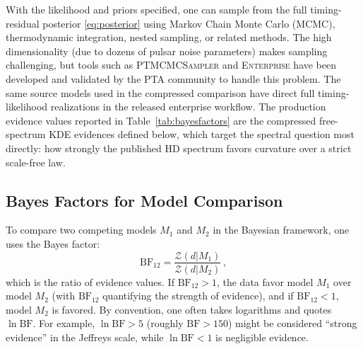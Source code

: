 \documentclass[symmetry,article,submit,pdftex,moreauthors]{Definitions/mdpi}
\begin{document}
With the likelihood and priors specified, one can sample from the full timing-residual posterior \eqref{eq:posterior} using Markov Chain Monte Carlo (MCMC), thermodynamic integration, nested sampling, or related methods. The high dimensionality (due to dozens of pulsar noise parameters) makes sampling challenging, but tools such as \textsc{PTMCMCSampler} and \textsc{Enterprise} \cite{NANOGrav15-Methods} have been developed and validated by the PTA community to handle this problem. The same source models used in the compressed comparison have direct full timing-likelihood realizations in the released enterprise workflow. The production evidence values reported in Table~\ref{tab:bayesfactors} are the compressed free-spectrum KDE evidences defined below, which target the spectral question most directly: how strongly the published HD spectrum favors curvature over a strict scale-free law.

\subsection{Bayes Factors for Model Comparison}
To compare two competing models $M_1$ and $M_2$ in the Bayesian framework, one uses the Bayes factor:
\begin{equation}\label{eq:bayes_factor}
    \mathrm{BF}_{12} = \frac{\mathcal{Z}(d|M_1)}{\mathcal{Z}(d|M_2)}\,,
\end{equation}
which is the ratio of evidence values. If $\mathrm{BF}_{12} > 1$, the data favor model $M_1$ over model $M_2$ (with $\mathrm{BF}_{12}$ quantifying the strength of evidence), and if $\mathrm{BF}_{12} < 1$, model $M_2$ is favored. By convention, one often takes logarithms and quotes $\ln \mathrm{BF}$. For example, $\ln \mathrm{BF} > 5$ (roughly $\mathrm{BF} > 150$) might be considered ``strong evidence'' in the Jeffreys scale, while $\ln \mathrm{BF} < 1$ is negligible evidence.
\end{document}

